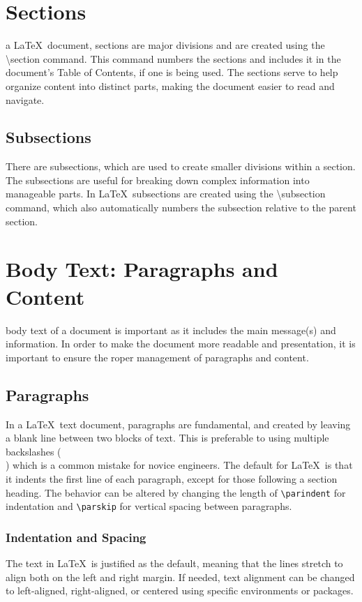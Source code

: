 \documentclass[12pt,journal,compsoc]{IEEEtran}
\begin{document}
\section{Sections}
 a \LaTeX\ document, sections are major divisions and are created using the \textbackslash{}section command. This command numbers the sections and includes it in the document’s Table of Contents, if one is being used. The sections serve to help organize content into distinct parts, making the document easier to read and navigate.

\subsection{Subsections}

There are subsections, which are used to create smaller divisions within a section. The subsections are useful for breaking down complex information into manageable parts. In \LaTeX\, subsections are created using the \textbackslash{}subsection command, which also automatically numbers the subsection relative to the parent section.

\section{Body Text: Paragraphs and Content}
 body text of a document is important as it includes the main message(s) and information. In order to make the document more readable and presentation, it is important to ensure the roper management of paragraphs and content. 

\subsection{Paragraphs}
In a \LaTeX\ text document, paragraphs are fundamental, and created by leaving a blank line between two blocks of text. This is preferable to using multiple backslashes (\\) which is a common mistake for novice engineers. The default for \LaTeX\ is that it indents the first line of each paragraph, except for those following a section heading. The behavior can be altered by changing the length of \texttt{\textbackslash parindent} for indentation and \texttt{\textbackslash parskip} for vertical spacing between paragraphs.  

\subsubsection{Indentation and Spacing}
The text in \LaTeX\ is justified as the default, meaning that the lines stretch to align both on the left and right margin. If needed, text alignment can be changed to left-aligned, right-aligned, or centered using specific environments or packages.
\end{document}
